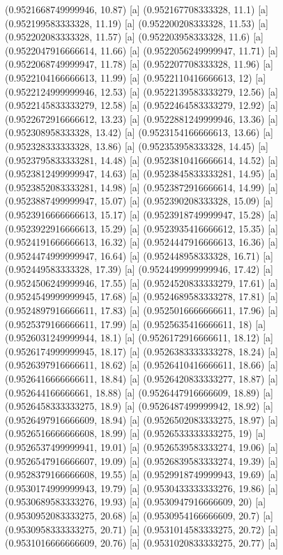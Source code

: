 {{{(0.9521668749999946, 10.87) [a] 
(0.952167708333328, 11.1) [a] 
(0.952199583333328, 11.19) [a] 
(0.952200208333328, 11.53) [a] 
(0.952202083333328, 11.57) [a] 
(0.952203958333328, 11.6) [a] 
(0.9522047916666614, 11.66) [a] 
(0.9522056249999947, 11.71) [a] 
(0.9522068749999947, 11.78) [a] 
(0.952207708333328, 11.96) [a] 
(0.9522104166666613, 11.99) [a] 
(0.9522110416666613, 12) [a] 
(0.9522124999999946, 12.53) [a] 
(0.9522139583333279, 12.56) [a] 
(0.9522145833333279, 12.58) [a] 
(0.9522464583333279, 12.92) [a] 
(0.9522672916666612, 13.23) [a] 
(0.9522881249999946, 13.36) [a] 
(0.952308958333328, 13.42) [a] 
(0.9523154166666613, 13.66) [a] 
(0.952328333333328, 13.86) [a] 
(0.952353958333328, 14.45) [a] 
(0.9523795833333281, 14.48) [a] 
(0.9523810416666614, 14.52) [a] 
(0.9523812499999947, 14.63) [a] 
(0.9523845833333281, 14.95) [a] 
(0.9523852083333281, 14.98) [a] 
(0.9523872916666614, 14.99) [a] 
(0.9523887499999947, 15.07) [a] 
(0.952390208333328, 15.09) [a] 
(0.9523916666666613, 15.17) [a] 
(0.9523918749999947, 15.28) [a] 
(0.9523922916666613, 15.29) [a] 
(0.9523935416666612, 15.35) [a] 
(0.9524191666666613, 16.32) [a] 
(0.9524447916666613, 16.36) [a] 
(0.9524474999999947, 16.64) [a] 
(0.952448958333328, 16.71) [a] 
(0.952449583333328, 17.39) [a] 
(0.9524499999999946, 17.42) [a] 
(0.9524506249999946, 17.55) [a] 
(0.9524520833333279, 17.61) [a] 
(0.9524549999999945, 17.68) [a] 
(0.9524689583333278, 17.81) [a] 
(0.9524897916666611, 17.83) [a] 
(0.9525016666666611, 17.96) [a] 
(0.9525379166666611, 17.99) [a] 
(0.9525635416666611, 18) [a] 
(0.9526031249999944, 18.1) [a] 
(0.9526172916666611, 18.12) [a] 
(0.9526174999999945, 18.17) [a] 
(0.9526383333333278, 18.24) [a] 
(0.9526397916666611, 18.62) [a] 
(0.9526410416666611, 18.66) [a] 
(0.9526416666666611, 18.84) [a] 
(0.9526420833333277, 18.87) [a] 
(0.952644166666661, 18.88) [a] 
(0.9526447916666609, 18.89) [a] 
(0.9526458333333275, 18.9) [a] 
(0.9526487499999942, 18.92) [a] 
(0.9526497916666609, 18.94) [a] 
(0.9526502083333275, 18.97) [a] 
(0.9526516666666608, 18.99) [a] 
(0.9526533333333275, 19) [a] 
(0.9526537499999941, 19.01) [a] 
(0.9526539583333274, 19.06) [a] 
(0.9526547916666607, 19.09) [a] 
(0.9526839583333274, 19.39) [a] 
(0.9528379166666608, 19.55) [a] 
(0.9529918749999943, 19.69) [a] 
(0.9530174999999943, 19.79) [a] 
(0.9530433333333276, 19.86) [a] 
(0.9530689583333276, 19.93) [a] 
(0.9530947916666609, 20) [a] 
(0.9530952083333275, 20.68) [a] 
(0.9530954166666609, 20.7) [a] 
(0.9530958333333275, 20.71) [a] 
(0.9531014583333275, 20.72) [a] 
(0.9531016666666609, 20.76) [a] 
(0.9531020833333275, 20.77) [a] 
}}}
